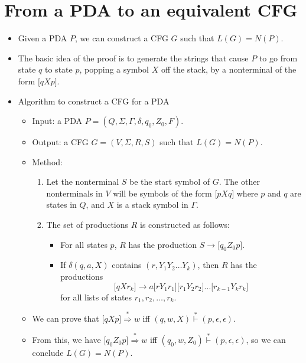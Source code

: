 \documentclass[]{article}
\begin{document}
\section{From a PDA to an equivalent CFG}
  \begin{itemize}
    \item Given a PDA $P$, we can construct a CFG $G$ such that $L(G) = N(P)$.
    \item The basic idea of the proof is to generate the strings that cause $P$
    to go from state $q$ to state $p$, popping a symbol $X$ off the stack, by a 
    nonterminal of the form $\lbrack qXp \rbrack$.
    \item Algorithm to construct a CFG for a PDA
      \begin{itemize}
        \item Input: a PDA $P = (Q,\Sigma,\Gamma,\delta,q_0,Z_0,F)$.
        \item Output: a CFG $G = (V,\Sigma,R,S)$ such that $L(G) = N(P)$.
        \item Method:
          \begin{enumerate}
            \item Let the nonterminal $S$ be the start symbol of $G$. The other 
            nonterminals in $V$ will be symbols of the form $\lbrack pXq 
            \rbrack$ where $p$ and $q$ are states in $Q$, and $X$ is a stack 
            symbol in $\Gamma$.
            \item The set of productions $R$ is constructed as follows:
              \begin{itemize}
                \item For all states $p$, $R$ has the production $S \rightarrow 
                \lbrack q_0Z_0p \rbrack$.
                \item If $\delta(q,a,X)$ contains $(r,Y_1Y_2\ldots Y_k)$, then 
                $R$ has the productions
                  \[ 
                    \lbrack qXr_k \rbrack \rightarrow a\lbrack rY_1r_1\rbrack
                    \lbrack r_1Y_2r_2 \rbrack  \ldots \lbrack r_{k-1}Y_kr_k 
                    \rbrack
                  \]
                for all lists of states $r_1,r_2,\ldots,r_k$.
              \end{itemize}
          \end{enumerate}
        \item We can prove that $\lbrack qXp \rbrack \overset{*}{\Rightarrow} w$
        iff $(q,w,X) \overset{*}{\vdash} (p,\epsilon,\epsilon)$.
        \item From this, we have $\lbrack q_0Z_0p \rbrack \overset{*}
        {\Rightarrow} w$ iff $(q_0,w,Z_0) \overset{*}{\vdash} (p,\epsilon,
        \epsilon)$, so we can conclude $L(G) = N(P)$.
      \end{itemize}
  \end{itemize}
  
\end{document}
